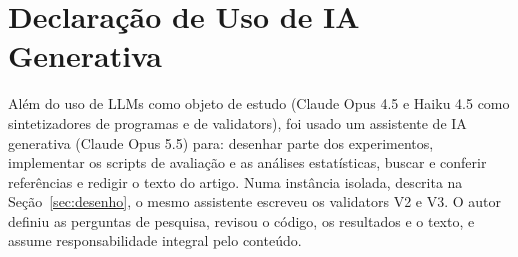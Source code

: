 \documentclass[sigconf,nonacm]{acmart}
\begin{document}
\section*{Declaração de Uso de IA Generativa}

Além do uso de LLMs como objeto de estudo (Claude Opus 4.5 e Haiku 4.5 como sintetizadores de programas e de validators), foi usado um assistente de IA generativa (Claude Opus 5.5) para: desenhar parte dos experimentos, implementar os scripts de avaliação e as análises estatísticas, buscar e conferir referências e redigir o texto do artigo. Numa instância isolada, descrita na Seção~\ref{sec:desenho}, o mesmo assistente escreveu os validators V2 e V3. O autor definiu as perguntas de pesquisa, revisou o código, os resultados e o texto, e assume responsabilidade integral pelo conteúdo.
\end{document}
